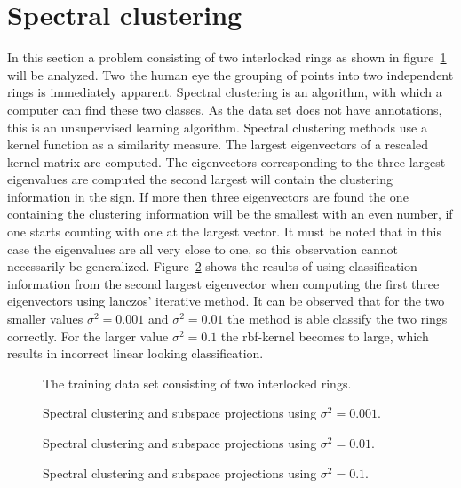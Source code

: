 \section{Spectral clustering}
In this section a problem consisting of two interlocked rings as shown in figure~\ref{fig:interlock} will be analyzed. Two the human eye the grouping of points into two independent rings is immediately apparent. Spectral clustering is an algorithm, with which a computer can find these two classes. As the data set does not have annotations, this is an unsupervised learning algorithm. Spectral clustering methods use a kernel function as a similarity measure. The largest eigenvectors of a rescaled kernel-matrix are computed. The eigenvectors corresponding to the three largest eigenvalues are computed the second largest will contain the clustering information in the sign. If more then three eigenvectors are found the one containing the clustering information will be the smallest with an even number, if one starts counting with one at the largest vector. It must be noted that in this case the eigenvalues are all very close to one, so this observation cannot necessarily be generalized.  Figure~\ref{fig:clusteringResults} shows the results of using classification information from the second largest eigenvector when computing the first three eigenvectors using lanczos' iterative method. It can be observed that for the two smaller values $\sigma^2 = 0.001$ and $\sigma^2 = 0.01$ the method is able classify the two rings correctly. For the larger value $\sigma^2 = 0.1$ the rbf-kernel becomes to large, which results in incorrect linear looking classification.  

\begin{figure}
\centering

\caption{The training data set consisting of two interlocked rings.}
\label{fig:interlock}
\end{figure}



\begin{figure}
\centering


\caption{Spectral clustering and subspace projections using $\sigma^2 = 0.001$.}


\caption{Spectral clustering and subspace projections using $\sigma^2 = 0.01$.}


\caption{Spectral clustering and subspace projections using $\sigma^2 = 0.1$.}
\label{fig:clusteringResults}
\end{figure}


